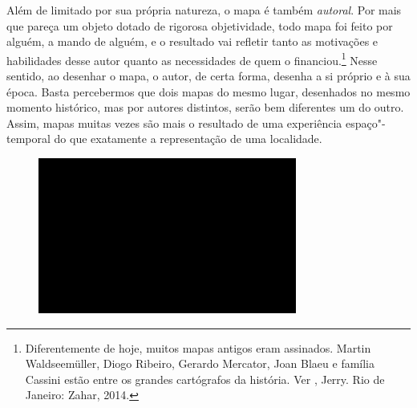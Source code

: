 Além de limitado por sua própria natureza, o mapa é também
\emph{autoral}. Por mais que pareça um objeto dotado de rigorosa
objetividade, todo mapa foi feito por alguém, a mando de alguém, e o
resultado vai refletir tanto as motivações e habilidades desse autor
quanto as necessidades de quem o financiou.\footnote{Diferentemente de
  hoje, muitos mapas antigos eram assinados. Martin Waldseemüller, Diogo
  Ribeiro, Gerardo Mercator, Joan Blaeu e família Cassini estão entre os
  grandes cartógrafos da história. Ver , Jerry. {} Rio de Janeiro: Zahar, 2014.} Nesse
sentido, ao desenhar o mapa, o autor, de certa forma, desenha a si
próprio e à sua época. Basta percebermos que dois mapas do mesmo lugar,
desenhados no mesmo momento histórico, mas por autores distintos, serão
bem diferentes um do outro. Assim, mapas muitas vezes são mais o
resultado de uma experiência espaço"-temporal do que exatamente a
representação de uma localidade.

\begin{figure}[!ht]

\centering
 \includegraphics[width=85mm]{./imgs/im1.jpg}
\caption{\tiny{}}

\end{figure}

